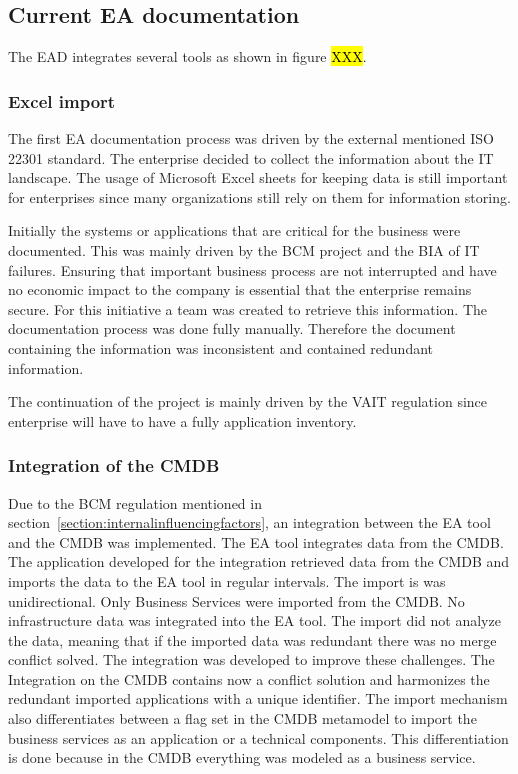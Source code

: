 \subsection{Current EA documentation}\label{subsection:currentead}

The EAD integrates several tools as shown in figure \hl{XXX}. 
\subsubsection{Excel import}

The first EA documentation process was driven by the external mentioned ISO 22301 standard. The enterprise decided to collect the information about the IT landscape. The usage of Microsoft Excel sheets for keeping data is still important for enterprises since many organizations still rely on them for information storing.\hl{}

Initially the systems or applications that are critical for the business were documented. This was mainly driven by the BCM project and the BIA of IT failures. Ensuring that important business process are not interrupted and have no economic impact to the company is essential that the enterprise remains secure. For this initiative a team was created to retrieve this information. The documentation process was done fully manually. Therefore the document containing the information was inconsistent and contained redundant information.

The continuation of the project is mainly driven by the VAIT regulation since enterprise will have to have a fully application inventory.

\subsubsection{Integration of the CMDB}
Due to the BCM regulation mentioned in section~\ref{section:internalinfluencingfactors}, an integration between the EA tool and the CMDB was implemented. The EA tool integrates data from the CMDB. The application developed for the integration retrieved data from the CMDB and imports the data to the EA tool in regular intervals. The import is was unidirectional. Only Business Services were imported from the CMDB. No infrastructure data was integrated into the EA tool. The import did not analyze the data, meaning that if the imported data was redundant there was no merge conflict solved. The integration was developed to improve these challenges. The Integration on the CMDB contains now a conflict solution and harmonizes the redundant imported applications with a unique identifier. The import mechanism also differentiates between a flag set in the CMDB metamodel to import the business services as an application or a technical components. This differentiation is done because in the CMDB everything was modeled as a business service.

